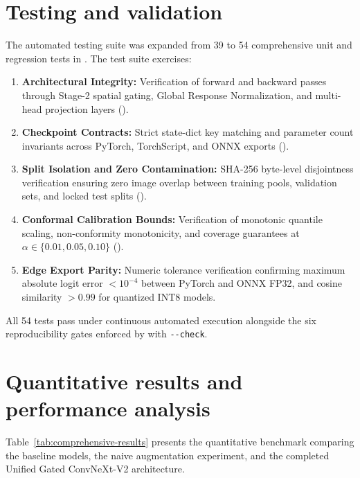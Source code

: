 \section{Testing and validation}

The automated testing suite was expanded from 39 to 54 comprehensive unit and regression tests in
. The test suite exercises:
\begin{enumerate}[leftmargin=1.4em,itemsep=3pt]
\item \textbf{Architectural Integrity:} Verification of forward and backward passes through Stage-2
      spatial gating, Global Response Normalization, and multi-head projection layers
      ().
\item \textbf{Checkpoint Contracts:} Strict state-dict key matching and parameter count invariants
      across PyTorch, TorchScript, and ONNX exports ().
\item \textbf{Split Isolation and Zero Contamination:} SHA-256 byte-level disjointness verification
      ensuring zero image overlap between training pools, validation sets, and locked test splits
      ().
\item \textbf{Conformal Calibration Bounds:} Verification of monotonic quantile scaling, non-conformity
      monotonicity, and coverage guarantees at $\alpha \in \{0.01, 0.05, 0.10\}$
      ().
\item \textbf{Edge Export Parity:} Numeric tolerance verification confirming maximum absolute logit error
      $< 10^{-4}$ between PyTorch and ONNX FP32, and cosine similarity $> 0.99$ for quantized INT8 models.
\end{enumerate}

All 54 tests pass under continuous automated execution alongside the six reproducibility gates
enforced by  with \texttt{-{}-check}.

\section{Quantitative results and performance analysis}

Table~\ref{tab:comprehensive-results} presents the quantitative benchmark comparing the baseline models,
the naive augmentation experiment, and the completed Unified Gated ConvNeXt-V2 architecture.

